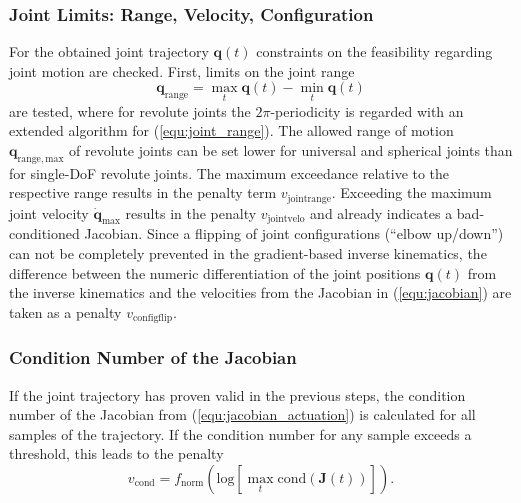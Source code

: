 \documentclass[fleqn,a4paper,10pt]{article}
\newcommand{\bm}[1]{\mathbf{#1}}
\begin{document}
\begin{multicols}{2}
\subsubsection{Joint Limits: Range, Velocity, Configuration}

For the obtained joint trajectory $\bm{q}(t)$ constraints on the feasibility regarding joint motion are checked.
First, limits on the joint range %
%
\begin{equation}
\bm{q}_\mathrm{range} = \max\limits_{t} \bm{q}(t) - \min\limits_{t} \bm{q}(t)
\label{equ:joint_range}
\end{equation}
%
are tested, where for revolute joints the $2\pi$-periodicity is regarded with an extended algorithm for (\ref{equ:joint_range}).
The allowed range of motion $\bm{q}_\mathrm{range,max}$ of revolute joints can be set lower for universal and spherical joints than for single-DoF revolute joints.
The maximum exceedance relative to the respective range results in the penalty term $v_\mathrm{jointrange}$.
%
Exceeding the maximum joint velocity $\dot{\bm{q}}_\mathrm{max}$ results in the penalty $v_\mathrm{jointvelo}$ and already indicates a bad-conditioned Jacobian.
%
Since a flipping of joint configurations (``elbow up/down'') can not be completely prevented in the gradient-based inverse kinematics, %
the difference between the numeric differentiation of the joint positions $\bm{q}(t)$ from the inverse kinematics and the velocities from the Jacobian in (\ref{equ:jacobian}) are taken as a penalty $v_\mathrm{configflip}$.


\subsubsection{Condition Number of the Jacobian}
\label{sec:constraint_jacobian}

If the joint trajectory has proven valid in the previous steps, the condition number of the Jacobian from (\ref{equ:jacobian_actuation}) is calculated for all samples of the trajectory.
If the condition number for any sample exceeds a threshold, this leads to the penalty
%
\begin{equation}
v_{\mathrm{cond}} = f_\mathrm{norm}(\mathrm{log}[\max\limits_{t}  \mathrm{cond}(\bm{J}(t))]). %
\end{equation}
%



\end{multicols}
\end{document}
